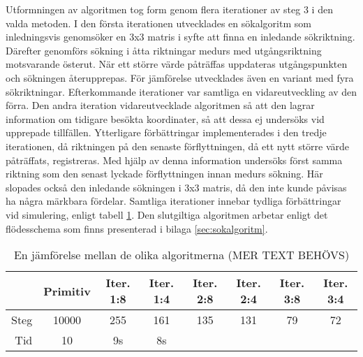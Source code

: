         Utformningen av algoritmen tog form genom flera iterationer av steg 3 i den valda metoden. I den första iterationen utvecklades en sökalgoritm som inledningsvis genomsöker en 3x3 matris i syfte att finna en inledande sökriktning. Därefter genomförs sökning i åtta riktningar medurs med utgångsriktning motsvarande österut. När ett större värde påträffas uppdateras utgångspunkten och sökningen återupprepas. För jämförelse utvecklades även en variant med fyra sökriktningar. Efterkommande iterationer var samtliga en vidareutveckling av den förra. Den andra iteration vidareutvecklade algoritmen så att den lagrar information om tidigare besökta koordinater, så att dessa ej undersöks vid upprepade tillfällen. Ytterligare förbättringar implementerades i den tredje iterationen, då riktningen på den senaste förflyttningen, då ett nytt större värde påträffats, registreras. Med hjälp av denna information undersöks först samma riktning som den senast lyckade förflyttningen innan medurs sökning. Här slopades också den inledande sökningen i 3x3 matris, då den inte kunde påvisas ha några märkbara fördelar. Samtliga iterationer innebar tydliga förbättringar vid simulering, enligt tabell \ref{tab:algoritmer}. Den slutgiltiga algoritmen arbetar enligt det flödesschema som finns presenterad i bilaga \ref{sec:sokalgoritm}.

        \begin{table}[hb]
            \caption{\label{tab:algoritmer}En jämförelse mellan de olika algoritmerna (MER TEXT BEHÖVS)}
            \centering
            \begin{tabular}{@{}rccccccc@{}}
            \toprule
                 & Primitiv & Iter. 1:8     & Iter. 1:4 & Iter. 2:8 & Iter. 2:4 & Iter. 3:8 & Iter. 3:4  \\ \midrule
            Steg & 10000    & 255           & 161       & 135       & 131       & 79        & 72 \\
            Tid  & 10       & 9s   & 8s   &  &  \\ \bottomrule
            \end{tabular}
        \end{table}

